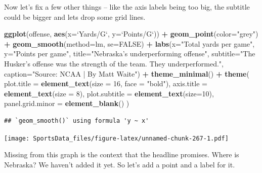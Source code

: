 \documentclass[]{book}
\newenvironment{Shaded}{\begin{snugshade}}{\end{snugshade}}
\newcommand{\DataTypeTok}[1]{\textcolor[rgb]{0.13,0.29,0.53}{#1}}
\newcommand{\DecValTok}[1]{\textcolor[rgb]{0.00,0.00,0.81}{#1}}
\newcommand{\KeywordTok}[1]{\textcolor[rgb]{0.13,0.29,0.53}{\textbf{#1}}}
\newcommand{\NormalTok}[1]{#1}
\newcommand{\OperatorTok}[1]{\textcolor[rgb]{0.81,0.36,0.00}{\textbf{#1}}}
\newcommand{\OtherTok}[1]{\textcolor[rgb]{0.56,0.35,0.01}{#1}}
\newcommand{\StringTok}[1]{\textcolor[rgb]{0.31,0.60,0.02}{#1}}
\begin{document}
Now let's fix a few other things -- like the axis labels being too big, the subtitle could be bigger and lets drop some grid lines.

\begin{Shaded}
\begin{Highlighting}[]
\KeywordTok{ggplot}\NormalTok{(offense, }\KeywordTok{aes}\NormalTok{(}\DataTypeTok{x=}\StringTok{`}\DataTypeTok{Yards/G}\StringTok{`}\NormalTok{, }\DataTypeTok{y=}\StringTok{`}\DataTypeTok{Points/G}\StringTok{`}\NormalTok{)) }\OperatorTok{+}\StringTok{ }
\StringTok{  }\KeywordTok{geom_point}\NormalTok{(}\DataTypeTok{color=}\StringTok{"grey"}\NormalTok{) }\OperatorTok{+}\StringTok{ }\KeywordTok{geom_smooth}\NormalTok{(}\DataTypeTok{method=}\NormalTok{lm, }\DataTypeTok{se=}\OtherTok{FALSE}\NormalTok{) }\OperatorTok{+}\StringTok{ }
\StringTok{  }\KeywordTok{labs}\NormalTok{(}\DataTypeTok{x=}\StringTok{"Total yards per game"}\NormalTok{, }\DataTypeTok{y=}\StringTok{"Points per game"}\NormalTok{, }\DataTypeTok{title=}\StringTok{"Nebraska's underperforming offense"}\NormalTok{, }\DataTypeTok{subtitle=}\StringTok{"The Husker's offense was the strength of the team. They underperformed."}\NormalTok{, }\DataTypeTok{caption=}\StringTok{"Source: NCAA | By Matt Waite"}\NormalTok{) }\OperatorTok{+}\StringTok{ }
\StringTok{  }\KeywordTok{theme_minimal}\NormalTok{() }\OperatorTok{+}\StringTok{ }
\StringTok{  }\KeywordTok{theme}\NormalTok{(}
    \DataTypeTok{plot.title =} \KeywordTok{element_text}\NormalTok{(}\DataTypeTok{size =} \DecValTok{16}\NormalTok{, }\DataTypeTok{face =} \StringTok{"bold"}\NormalTok{),}
    \DataTypeTok{axis.title =} \KeywordTok{element_text}\NormalTok{(}\DataTypeTok{size =} \DecValTok{8}\NormalTok{), }
    \DataTypeTok{plot.subtitle =} \KeywordTok{element_text}\NormalTok{(}\DataTypeTok{size=}\DecValTok{10}\NormalTok{), }
    \DataTypeTok{panel.grid.minor =} \KeywordTok{element_blank}\NormalTok{()}
\NormalTok{    ) }
\end{Highlighting}
\end{Shaded}

\begin{verbatim}
## `geom_smooth()` using formula 'y ~ x'
\end{verbatim}

\texttt{[image: SportsData\_files/figure-latex/unnamed-chunk-267-1.pdf]}

Missing from this graph is the context that the headline promises. Where is Nebraska? We haven't added it yet. So let's add a point and a label for it.
\end{document}
